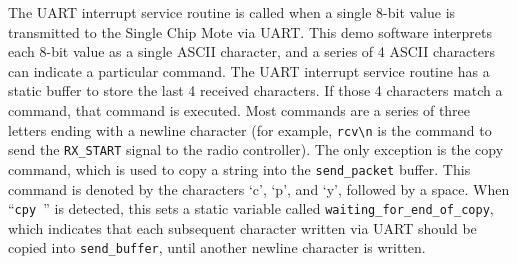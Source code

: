 The UART interrupt service routine is called when a single 8-bit value is transmitted to the Single Chip Mote via UART. This demo software interprets each 8-bit value as a single ASCII character, and a series of 4 ASCII characters can indicate a particular command. The UART interrupt service routine has a static buffer to store the last 4 received characters. If those 4 characters match a command, that command is executed. Most commands are a series of three letters ending with a newline character (for example, \texttt{rcv\textbackslash n} is the command to send the \texttt{RX\_START} signal to the radio controller). The only exception is the copy command, which is used to copy a string into the \texttt{send\_packet} buffer. This command is denoted by the characters `c', `p', and `y', followed by a space. When ``\texttt{cpy }'' is detected, this sets a static variable called \texttt{waiting\_for\_end\_of\_copy}, which indicates that each subsequent character written via UART should be copied into \texttt{send\_buffer}, until another newline character is written.

